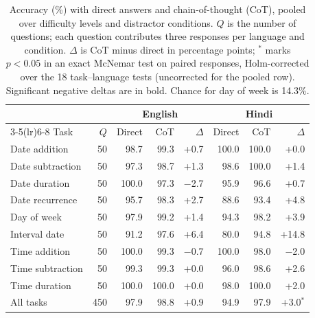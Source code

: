 \begin{table}[t]
\centering
\begin{tabular}{lrrrrrrr}
\toprule
 & & \multicolumn{3}{c}{English} & \multicolumn{3}{c}{Hindi} \\
\cmidrule(lr){3-5}\cmidrule(lr){6-8}
Task & $Q$ & Direct & CoT & $\Delta$ & Direct & CoT & $\Delta$ \\
\midrule
Date addition & 50 & 98.7 & 99.3 & +0.7\phantom{$^{*}$} & 100.0 & 100.0 & +0.0\phantom{$^{*}$} \\
Date subtraction & 50 & 97.3 & 98.7 & +1.3\phantom{$^{*}$} & 98.6 & 100.0 & +1.4\phantom{$^{*}$} \\
Date duration & 50 & 100.0 & 97.3 & $-$2.7\phantom{$^{*}$} & 95.9 & 96.6 & +0.7\phantom{$^{*}$} \\
Date recurrence & 50 & 95.7 & 98.3 & +2.7\phantom{$^{*}$} & 88.6 & 93.4 & +4.8\phantom{$^{*}$} \\
Day of week & 50 & 97.9 & 99.2 & +1.4\phantom{$^{*}$} & 94.3 & 98.2 & +3.9\phantom{$^{*}$} \\
Interval date & 50 & 91.2 & 97.6 & +6.4\phantom{$^{*}$} & 80.0 & 94.8 & +14.8\phantom{$^{*}$} \\
Time addition & 50 & 100.0 & 99.3 & $-$0.7\phantom{$^{*}$} & 100.0 & 98.0 & $-$2.0\phantom{$^{*}$} \\
Time subtraction & 50 & 99.3 & 99.3 & +0.0\phantom{$^{*}$} & 96.0 & 98.6 & +2.6\phantom{$^{*}$} \\
Time duration & 50 & 100.0 & 100.0 & +0.0\phantom{$^{*}$} & 98.0 & 100.0 & +2.0\phantom{$^{*}$} \\
\midrule
All tasks & 450 & 97.9 & 98.8 & +0.9\phantom{$^{*}$} & 94.9 & 97.9 & +3.0$^{*}$ \\
\bottomrule
\end{tabular}
\caption{Accuracy (\%) with direct answers and chain-of-thought (CoT), pooled over difficulty levels and distractor conditions. $Q$ is the number of questions; each question contributes three responses per language and condition. $\Delta$ is CoT minus direct in percentage points; $^{*}$ marks $p<0.05$ in an exact McNemar test on paired responses, Holm-corrected over the 18 task--language tests (uncorrected for the pooled row). Significant negative deltas are in bold. Chance for day of week is 14.3\%.}
\label{tab:cot-delta}
\end{table}
